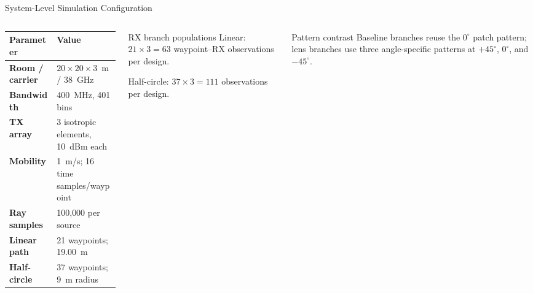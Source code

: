 \begin{frame}[t]{System-Level Simulation Configuration}
\scriptsize
\begin{columns}[T,onlytextwidth]
  \renewcommand{\arraystretch}{1.08}
  \begin{tabularx}{\linewidth}{@{}>{\bfseries}p{0.43\linewidth}X@{}}
    \toprule
    Parameter & Value\\
    \midrule
    Room / carrier & $20\times20\times3$~m / 38~GHz\\
    Bandwidth & 400~MHz, 401 bins\\
    TX array & 3 isotropic elements, 10~dBm each\\
    Mobility & 1~m/s; 16 time samples/waypoint\\
    Ray samples & 100{,}000 per source\\
    Linear path & 21 waypoints; 19.00~m\\
    Half-circle & 37 waypoints; 9~m radius\\
    \bottomrule
  \end{tabularx}

  \begin{block}{RX branch populations}
    Linear: $21\times3=63$ waypoint--RX observations per design.\par\smallskip
    Half-circle: $37\times3=111$ observations per design.
  \end{block}
  \begin{block}{Pattern contrast}
    Baseline branches reuse the $0^\circ$ patch pattern; lens branches use three
    angle-specific patterns at $+45^\circ$, $0^\circ$, and $-45^\circ$.
  \end{block}
\end{columns}
\end{frame}


